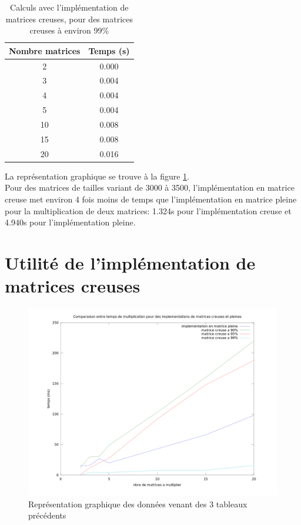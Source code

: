 \documentclass[a4paper]{scrartcl}
\begin{document}
\begin{table}
    \caption{Calculs avec l'implémentation de matrices creuses, pour des matrices creuses à environ 99\%}
    \label{tab:99}
    \begin{center}
        \begin{tabular}{c|c}
            Nombre matrices & Temps (s)\\
            \hline
             2 &         0.000\\
    3 &           0.004\\
    4 &        0.004\\
    5 &       0.004\\
    10 &         0.008\\
    15 &         0.008 \\
    20 &         0.016\\
        \end{tabular}
    \end{center}
\end{table}

La représentation graphique se trouve à la figure \ref{fig:time}.\\

Pour des matrices de tailles variant de 3000 à 3500,  l'implémentation en matrice creuse met environ 4 fois moins de temps que l'implémentation en matrice pleine pour la multiplication de deux matrices: 1.324s pour l'implémentation creuse et 4.940s pour l'implémentation pleine.

\newpage
\section{Utilité de l'implémentation de matrices creuses}
\begin{figure}
    \begin{center}
        \includegraphics[width=\textwidth]{matrixgraph.png}
        \caption{Représentation graphique des données venant des 3 tableaux précédents}
        \label{fig:time}
    \end{center}
\end{figure}
\end{document}
